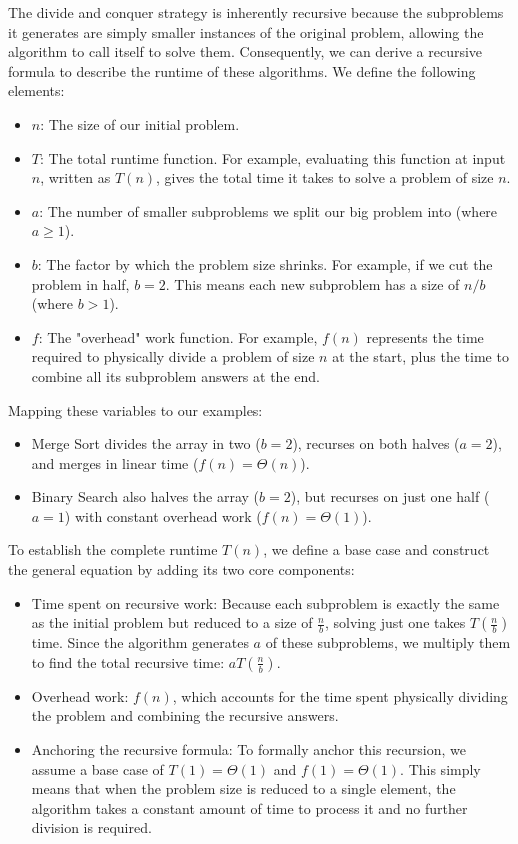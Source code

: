 \documentclass[11pt, a4paper]{article}
\begin{document}
The divide and conquer strategy is inherently recursive because the subproblems it generates are simply smaller instances of the original problem, allowing the algorithm to call itself to solve them. Consequently, we can derive a recursive formula to describe the runtime of these algorithms. We define the following elements:
\begin{itemize}
    \item $n$: The size of our initial problem.
    \item $T$: The total runtime function. For example, evaluating this function at input $n$, written as $T(n)$, gives the total time it takes to solve a problem of size $n$.
    \item $a$: The number of smaller subproblems we split our big problem into (where $a \ge 1$).
    \item $b$: The factor by which the problem size shrinks. For example, if we cut the problem in half, $b = 2$. This means each new subproblem has a size of $n/b$ (where $b > 1$).
    \item $f$: The "overhead" work function. For example, $f(n)$ represents the time required to physically divide a problem of size $n$ at the start, plus the time to combine all its subproblem answers at the end.
\end{itemize}
\newpage
Mapping these variables to our examples:
\begin{itemize}
    \item Merge Sort divides the array in two ($b=2$), recurses on both halves ($a=2$), and merges in linear time ($f(n) = \Theta(n)$).

    \item  Binary Search also halves the array ($b=2$), but recurses on just one half ($a=1$) with constant overhead work ($f(n) = \Theta(1)$).
\end{itemize}


To establish the complete runtime $T(n)$, we define a base case and construct the general equation by adding its two core components:

\begin{itemize}
    \item Time spent on recursive work: Because each subproblem is exactly the same as the initial problem but reduced to a size of $\frac{n}{b}$, solving just one takes $T\left(\frac{n}{b}\right)$ time. Since the algorithm generates $a$ of these subproblems, we multiply them to find the total recursive time: $aT\left(\frac{n}{b}\right)$.

    \item Overhead work: $f(n)$, which accounts for the time spent physically dividing the problem and combining the recursive answers. 

    \item Anchoring the recursive formula: To formally anchor this recursion, we assume a base case of $T(1) = \Theta(1)$ and $f(1) = \Theta(1)$. This simply means that when the problem size is reduced to a single element, the algorithm takes a constant amount of time to process it and no further division is required.
\end{itemize}
\end{document}
